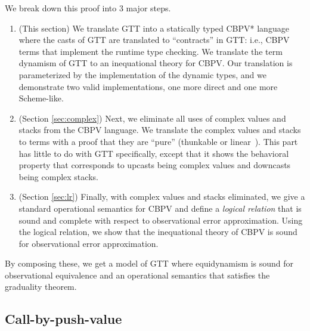 \documentclass[acmsmall,nonacm]{acmart}
\newcommand{\cbpvstar}{CBPV*}
\begin{document}
We break down this proof into 3 major steps.
\begin{enumerate}
\item (This section) We translate GTT into a statically typed \cbpvstar\/
  language where the casts of GTT are translated to ``contracts'' in
  GTT: i.e., CBPV terms that implement the runtime type checking. We
  translate the term dynamism of GTT to an inequational theory for CBPV.
  Our translation is parameterized by the implementation of the dynamic
  types, and we demonstrate two valid implementations, one more direct
  and one more Scheme-like.
\item (Section \ref{sec:complex}) Next, we eliminate all uses of complex
  values and stacks from the CBPV language. We translate the complex
  values and stacks to terms with a proof that they are ``pure''
  (thunkable or linear~\cite{munchmaccagnoni14nonassociative}). This part has little to do with GTT
  specifically, except that it shows the behavioral property that
  corresponds to upcasts being complex values and downcasts being
  complex stacks.
\item (Section \ref{sec:lr}) Finally, with complex values and stacks
  eliminated, we give a standard operational semantics for CBPV and
  define a \emph{logical relation} that is sound and complete with
  respect to observational error approximation. Using the logical
  relation, we show that the inequational theory of CBPV is sound for
  observational error approximation.
\end{enumerate}

By composing these, we get a model of GTT where equidynamism is sound
for observational equivalence and an operational semantics that
satisfies the graduality theorem.

\subsection{Call-by-push-value}
\label{sec:cbpvstar}
\end{document}
